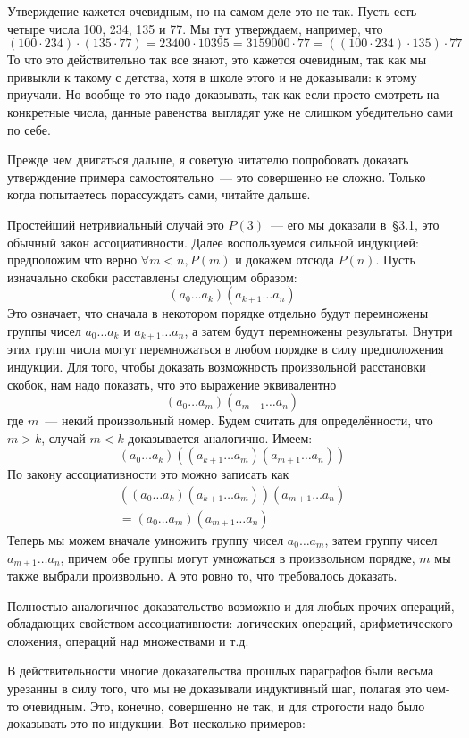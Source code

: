 Утверждение кажется очевидным, но на самом деле это не так. Пусть есть четыре числа 100, 234, 135 и 77. Мы тут утверждаем, например, что
$$(100\cdot 234)\cdot (135 \cdot77) = 23400 \cdot 10395 = 3159000 \cdot 77 = ((100\cdot 234)\cdot 135) \cdot77$$
То что это действительно так все знают, это кажется очевидным, так как мы привыкли к такому с детства, хотя в школе этого и не доказывали: к этому приучали. Но вообще-то это надо доказывать, так как если просто смотреть на конкретные числа, данные равенства выглядят уже не слишком убедительно сами по себе.

Прежде чем двигаться дальше, я советую читателю попробовать доказать утверждение примера самостоятельно~— это совершенно не сложно. Только когда попытаетесь порассуждать сами, читайте дальше.

Простейший нетривиальный случай это $P(3)$~— его мы доказали в~\S3.1, это обычный закон ассоциативности. Далее воспользуемся сильной индукцией: предположим что верно $\forall m<n, P(m)$ и докажем отсюда $P(n)$. Пусть изначально скобки расставлены следующим образом:
$$(a_0\ldots a_k)(a_{k+1}\ldots a_n)$$
Это означает, что сначала в некотором порядке отдельно будут перемножены группы чисел $a_0\ldots a_k$ и $a_{k+1}\ldots a_n$, а затем будут перемножены результаты. Внутри этих групп числа могут перемножаться в любом порядке в силу предположения индукции. Для того, чтобы доказать возможность произвольной расстановки скобок, нам надо показать, что это выражение эквивалентно
$$(a_0\ldots a_m)(a_{m+1}\ldots a_n)$$
где $m$~— некий произвольный номер. Будем считать для определённости, что $m>k$, случай $m<k$ доказывается аналогично. Имеем:
$$(a_0\ldots a_k)((a_{k+1}\ldots a_m)(a_{m+1}\ldots a_n))$$
По закону ассоциативности это можно записать как
\begin{align*}
((a_0\ldots a_k)(a_{k+1}\ldots a_m))(a_{m+1}\ldots a_n)\\
= (a_0\ldots  a_m)(a_{m+1}\ldots a_n)
\end{align*}
Теперь мы можем вначале умножить группу чисел $a_0\ldots a_m$, затем группу чисел $a_{m+1}\ldots a_n$, причем обе группы могут умножаться в произвольном порядке, $m$ мы также выбрали произвольно. А это ровно то, что требовалось доказать.

Полностью аналогичное доказательство возможно и для любых прочих операций, обладающих свойством ассоциативности: логических операций, арифметического сложения, операций над множествами и т.д.

В действительности многие доказательства прошлых параграфов были весьма урезанны в силу того, что мы не доказывали индуктивный шаг, полагая это чем-то очевидным. Это, конечно, совершенно не так, и для строгости надо было доказывать это по индукции. Вот несколько примеров:

